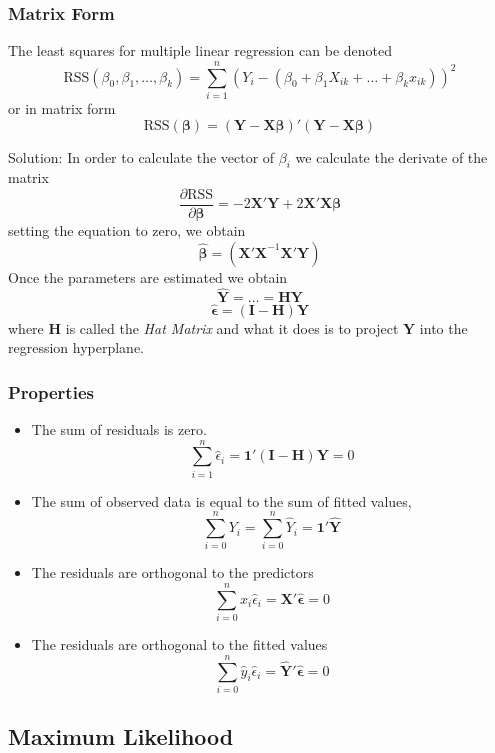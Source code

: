 \subsubsection{Matrix Form}
The least squares for multiple linear regression can be denoted 
\begin{equation}
    \text{RSS}(\beta_0,\beta_1,\dots,\beta_k) = \sum_{i=1}^n (Y_i - (\beta_0 + \beta_1 X_{ik} + \dots + \beta_k x_{ik}))^2
\end{equation}
or in matrix form
\begin{equation}
    \text{RSS}(\bm{\beta}) = (\bm{Y}-\bm{X\beta})'(\bm{Y}-\bm{X\beta})
\end{equation}

\begin{tcolorbox}
Solution: In order to calculate the vector of $\beta_i$ we calculate the
derivate of the matrix
\begin{equation*}
    \frac{\partial \text{RSS}}{\partial\bm{\beta}} = -2\bm{X'Y} + 2\bm{X'X\beta}
\end{equation*}
setting the equation to zero, we obtain
\begin{equation*}
    \bm{\hat{\beta}} = (\bm{X'X}^{-1} \bm{X'Y})
\end{equation*}
Once the parameters are estimated we obtain
\begin{equation}
    \bm{\hat{Y}} = \dots = \bm{HY}
\end{equation}
\begin{equation}
    \bm{\hat{\epsilon}} = \bm{(I-H)Y}
\end{equation}
where $\bm{H}$ is called the \textit{Hat Matrix} and what it does is to project $\bm{Y}$ into the regression hyperplane.
\end{tcolorbox}

\subsubsection{Properties}
\begin{itemize}
    \item The sum of residuals is zero.
    \[ \sum_{i=1}^n \hat{\epsilon}_i = \bm{1'(I-H)Y} = 0 \]
    \item The sum of observed data is equal to the sum of fitted values,
    \[ \sum_{i=0}^n Y_i = \sum_{i=0}^n \hat{Y}_i = \bm{1'\hat{Y}} \]
    \item The residuals are orthogonal to the predictors
    \[ \sum_{i=0}^n x_i\hat{\epsilon}_i = \bm{X'\hat{\epsilon}} = 0 \]
    \item The residuals are orthogonal to the fitted values
    \[ \sum_{i=0}^n \hat{y}_i\hat{\epsilon}_i = \bm{\hat{Y}'\hat{\epsilon}} = 0 \]
\end{itemize}

\subsection{Maximum Likelihood}
